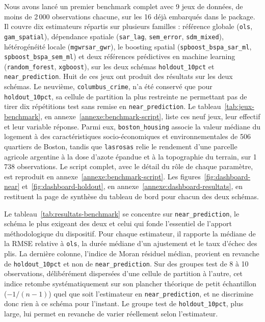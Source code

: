 \documentclass[11pt,a4paper]{article}
\begin{document}
Nous avons lancé un premier benchmark complet avec 9 jeux de données, de moins de 2\,000 observations chacune, sur les 16 déjà embarqués dans le package. Il couvre dix estimateurs répartis sur plusieurs familles : référence globale (\texttt{ols}, \texttt{gam\_spatial}), dépendance spatiale (\texttt{sar\_lag}, \texttt{sem\_error}, \texttt{sdm\_mixed}), hétérogénéité locale (\texttt{mgwrsar\_gwr}), le boosting spatial (\texttt{spboost\_bspa\_sar\_ml}, \texttt{spboost\_bspa\_sem\_ml}) et deux références prédictives en machine learning (\texttt{random\_forest}, \texttt{xgboost}), sur les deux schémas \texttt{holdout\_10pct} et \texttt{near\_prediction}. Huit de ces jeux ont produit des résultats sur les deux schémas. Le neuvième, \texttt{columbus\_crime}, n'a été conservé que pour \texttt{holdout\_10pct}, sa cellule de partition la plus restreinte ne permettant pas de tirer dix répétitions test sans remise en \texttt{near\_prediction}. Le tableau~\ref{tab:jeux-benchmark}, en annexe~\ref{annexe:benchmark-script}, liste ces neuf jeux, leur effectif et leur variable réponse. Parmi eux, \texttt{boston\_housing} associe la valeur médiane du logement à des caractéristiques socio-économiques et environnementales de 506 quartiers de Boston, tandis que \texttt{lasrosas} relie le rendement d'une parcelle agricole argentine à la dose d'azote épandue et à la topographie du terrain, sur 1\,738 observations. Le script complet, avec le détail du rôle de chaque paramètre, est reproduit en annexe~\ref{annexe:benchmark-script}. Les figures~\ref{fig:dashboard-near} et~\ref{fig:dashboard-holdout}, en annexe~\ref{annexe:dashboard-resultats}, en restituent la page de synthèse du tableau de bord pour chacun des deux schémas.

Le tableau~\ref{tab:resultats-benchmark} se concentre sur \texttt{near\_prediction}, le schéma le plus exigeant des deux et celui qui fonde l'essentiel de l'apport méthodologique du dispositif. Pour chaque estimateur, il rapporte la médiane de la RMSE relative à \texttt{ols}, la durée médiane d'un ajustement et le taux d'échec des plis. La dernière colonne, l'indice de Moran résiduel médian, provient en revanche de \texttt{holdout\_10pct} et non de \texttt{near\_prediction}. Sur des groupes test de 8 à 10 observations, délibérément dispersées d'une cellule de partition à l'autre, cet indice retombe systématiquement sur son plancher théorique de petit échantillon ($-1/(n-1)$) quel que soit l'estimateur en \texttt{near\_prediction}, et ne discrimine donc rien à ce schéma pour l'instant. Le groupe test de \texttt{holdout\_10pct}, plus large, lui permet en revanche de varier réellement selon l'estimateur.
\end{document}
